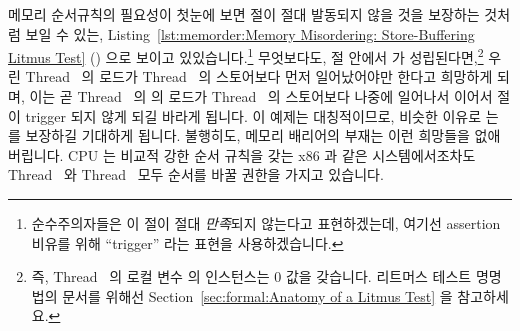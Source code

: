 메모리 순서규칙의 필요성이 첫눈에 보면  절이 절대 발동되지 않을 것을
보장하는 것처럼 보일 수 있는,
Listing~\ref{lst:memorder:Memory Misordering: Store-Buffering Litmus Test}
()
으로 보이고 있있습니다.\footnote{
	순수주의자들은 이  절이 절대 \emph{만족}되지 않는다고
	표현하겠는데, 여기선 assertion 비유를 위해 ``trigger'' 라는 표현을
	사용하겠습니다.}
무엇보다도,  절 안에서  가 성립된다면,\footnote{
	즉, Thread~ 의 로컬 변수  의 인스턴스는 0 값을
	갖습니다.
	리트머스 테스트 명명법의 문서를 위해선
	Section~\ref{sec:formal:Anatomy of a Litmus Test} 을 참고하세요.}
우린 Thread~ 의  로드가 Thread~ 의  스토어보다
먼저 일어났어야만 한다고 희망하게 되며, 이는 곧 Thread~ 의  의
로드가 Thread~ 의  스토어보다 나중에 일어나서 
이어서  절이 trigger 되지 않게 되길 바라게 됩니다.
이 예제는 대칭적이므로, 비슷한 이유로  는  를
보장하길 기대하게 됩니다.
불행히도, 메모리 배리어의 부재는 이런 희망들을 없애버립니다.
CPU 는 비교적 강한 순서 규칙을 갖는 x86 과 같은 시스템에서조차도
Thread~ 와 Thread~ 모두 순서를 바꿀 권한을 가지고 있습니다.

